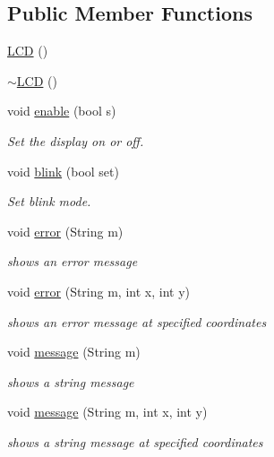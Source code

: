 \subsection*{Public Member Functions}
\begin{DoxyCompactItemize}
\item 
\hyperlink{class_l_c_d_a00bb2db1390721abc7b24ac4b8c276c8}{L\-C\-D} ()
\item 
\hyperlink{class_l_c_d_a5ac2667d164486b73b35dce3fd76bd95}{$\sim$\-L\-C\-D} ()
\item 
void \hyperlink{class_l_c_d_a744d30666c9d253089ce10b551854a2f}{enable} (bool s)
\begin{DoxyCompactList}\small\item\em Set the display on or off. \end{DoxyCompactList}\item 
void \hyperlink{class_l_c_d_ad034fa16a3b92276071741d9b31240e5}{blink} (bool set)
\begin{DoxyCompactList}\small\item\em Set blink mode. \end{DoxyCompactList}\item 
void \hyperlink{class_l_c_d_a728c09b7c47d67fc544ed87d06662eb4}{error} (String m)
\begin{DoxyCompactList}\small\item\em shows an error message \end{DoxyCompactList}\item 
void \hyperlink{class_l_c_d_a510e3f387c93e318402163f96d69c2a2}{error} (String m, int x, int y)
\begin{DoxyCompactList}\small\item\em shows an error message at specified coordinates \end{DoxyCompactList}\item 
void \hyperlink{class_l_c_d_a34190efc6a03bb5c0b6cdfff2d7199b9}{message} (String m)
\begin{DoxyCompactList}\small\item\em shows a string message \end{DoxyCompactList}\item 
void \hyperlink{class_l_c_d_a9974c0a77562d699d422992d9bfa1915}{message} (String m, int x, int y)
\begin{DoxyCompactList}\small\item\em shows a string message at specified coordinates \end{DoxyCompactList}\item 

\end{DoxyCompactItemize}
